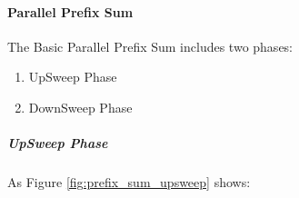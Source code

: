 \paragraph{Parallel Prefix Sum}

The Basic Parallel Prefix Sum includes two phases:

\begin{enumerate}
    \item UpSweep Phase 
    \item DownSweep Phase
\end{enumerate}


\subparagraph{UpSweep Phase}

As Figure \ref{fig:prefix_sum_upsweep} shows: 



